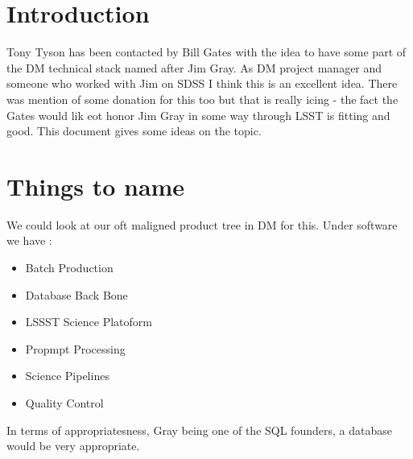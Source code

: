 \section{Introduction}

Tony Tyson has been contacted by Bill Gates with the idea to have some part of the DM technical stack named
after Jim Gray. As DM project manager and someone who worked with Jim on SDSS I think this is an excellent idea.  There was mention of some donation for this too but that is really icing - the fact the Gates would lik eot honor Jim Gray in some way through LSST is fitting and good. This document gives some ideas on the topic.

\section{Things to name}

We could look at our oft maligned product tree in DM for this. Under software we have :
\begin{itemize}
\item Batch Production
\item Database Back Bone
\item LSSST Science Platoform
\item Propmpt Processing
\item Science Pipelines
\item Quality Control
\end{itemize}


In terms of appropriatesness, Gray being one of the SQL founders, a database would be very appropriate.

